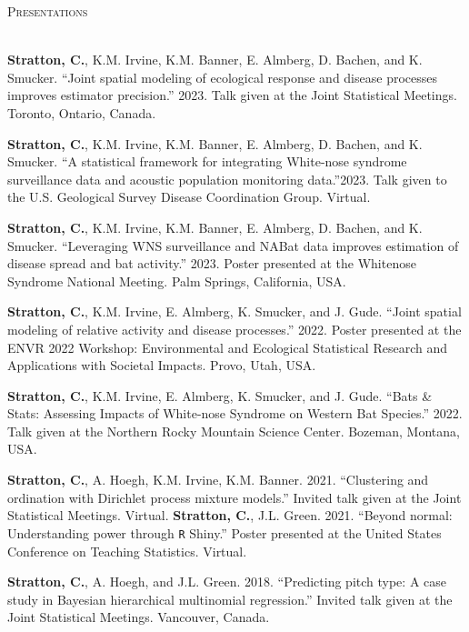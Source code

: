 \documentclass[a4paper]{article}
\newcommand{\lineunder} {
	\vspace*{-8pt} \\
	\hspace*{-18pt} \hrulefill \\
}
\newcommand{\header} [1] {
	{\hspace*{-18pt}\vspace*{6pt} \textsc{#1}}
	\vspace*{-6pt} \lineunder
}
\begin{document}
\header{Presentations}
\vspace*{2mm}

\textbf{Stratton, C.}, K.M. Irvine, K.M. Banner, E. Almberg, D. Bachen,
and K. Smucker. ``Joint spatial modeling of ecological response and
disease processes improves estimator precision.'' 2023. Talk given at
the Joint Statistical Meetings. Toronto, Ontario, Canada. \vspace*{2mm}

\textbf{Stratton, C.}, K.M. Irvine, K.M. Banner, E. Almberg, D. Bachen,
and K. Smucker. ``A statistical framework for integrating White-nose
syndrome surveillance data and acoustic population monitoring
data.''2023. Talk given to the U.S. Geological Survey Disease
Coordination Group. Virtual. \vspace*{2mm}

\textbf{Stratton, C.}, K.M. Irvine, K.M. Banner, E. Almberg, D. Bachen,
and K. Smucker. ``Leveraging WNS surveillance and NABat data improves
estimation of disease spread and bat activity.'' 2023. Poster presented
at the Whitenose Syndrome National Meeting. Palm Springs, California,
USA. \vspace*{2mm}

\textbf{Stratton, C.}, K.M. Irvine, E. Almberg, K. Smucker, and J. Gude.
``Joint spatial modeling of relative activity and disease processes.''
2022. Poster presented at the ENVR 2022 Workshop: Environmental and
Ecological Statistical Research and Applications with Societal Impacts.
Provo, Utah, USA. \vspace*{2mm}

\textbf{Stratton, C.}, K.M. Irvine, E. Almberg, K. Smucker, and J. Gude.
``Bats \& Stats: Assessing Impacts of White-nose Syndrome on Western Bat
Species.'' 2022. Talk given at the Northern Rocky Mountain Science
Center. Bozeman, Montana, USA. \vspace*{2mm}

\textbf{Stratton, C.}, A. Hoegh, K.M. Irvine, K.M. Banner. 2021.
``Clustering and ordination with Dirichlet process mixture models.''
Invited talk given at the Joint Statistical Meetings. Virtual.
\vspace*{2mm} \newpage \textbf{Stratton, C.}, J.L. Green. 2021. ``Beyond
normal: Understanding power through \texttt{R} Shiny.'' Poster presented
at the United States Conference on Teaching Statistics. Virtual.
\vspace*{2mm}

\textbf{Stratton, C.}, A. Hoegh, and J.L. Green. 2018. ``Predicting
pitch type: A case study in Bayesian hierarchical multinomial
regression.'' Invited talk given at the Joint Statistical Meetings.
Vancouver, Canada. \vspace*{2mm}
\end{document}
